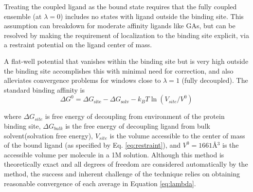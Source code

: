 \documentclass[12pt]{article}
\begin{document}
Treating the coupled ligand as the bound state requires that the fully coupled ensemble (at $\lambda=0$) includes no states with ligand outside the binding site. This assumption can breakdown for moderate affinity ligands like GAs, but can be resolved by making the requirement of localization to the binding site explicit, via a restraint potential on the ligand center of mass.  

A flat-well potential that vanishes within the binding site but is very high outside the binding site accomplishes this with minimal need for correction, and also alleviates convergence problems for windows close to $\lambda=1$ (fully decoupled).  The standard binding affinity is 
		\begin{equation}
	  		\Delta G^{0}=\Delta G_{\mathrm{site}}-\Delta G_{\mathrm{solv}}-k_{B}T  \ln (V_{site} /V^{0})	\label{eq:deltag}
		\end{equation} 

		where $\Delta G_{site}$ is free energy of decoupling from environment of the protein binding site,  $\Delta G_{bulk}$ is the free energy of decoupling ligand from bulk solvent(solvation free energy), $V_{site}$ is the volume accessible to the center of mass of the bound ligand (as specified by Eq. \ref{eq:restraint}), and $V^{0} = 1661 $\AA$^{3}$ is the accessible volume per molecule in a 1M solution.  Although this method is theoretically exact and all degrees of freedom are considered automatically by the method, the success and inherent challenge of the technique relies on obtaining reasonable convergence of each average in Equation \ref{eq:lambda}. 
		
\end{document}
